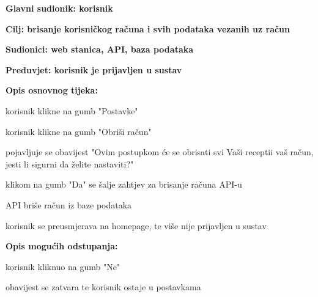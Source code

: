 				
				
					\noindent {}
					\begin{packed_item}
						\item \textbf{Glavni sudionik: korisnik}
						\item  \textbf{Cilj: brisanje korisničkog računa i svih podataka vezanih uz račun}
						\item  \textbf{Sudionici: web stanica, API, baza podataka}
						\item  \textbf{Preduvjet: korisnik je prijavljen u sustav}
						
						\item  \textbf{Opis osnovnog tijeka:}
						\item[] \begin{packed_enum}
							\item korisnik klikne na gumb "Postavke"
							\item korisnik klikne na gumb "Obriši račun"
							\item pojavljuje se obavijest "Ovim postupkom će se obrisati svi Vaši receptii vaš račun, jesti li sigurni da želite nastaviti?"
							\item klikom na gumb "Da" se šalje zahtjev za brisanje računa API-u
							\item API briše račun iz baze podataka
							\item korisnik se preusmjerava na homepage, te više nije prijavljen u sustav
						\end{packed_enum}
						
						\item  \textbf{Opis mogućih odstupanja:}
						\item[] \begin{packed_item}							
							\item[4.a] korisnik kliknuo na gumb "Ne"
							\begin{packed_enum}
								\item obavijest se zatvara te korisnik ostaje u postavkama
							\end{packed_enum}
						\end{packed_item}
					\end{packed_item}



